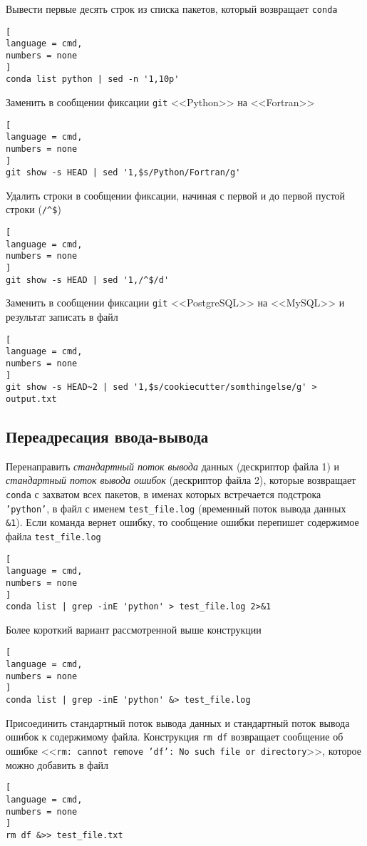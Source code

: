 \documentclass[%
	11pt,
	a4paper,
	utf8,
		]{article}
\begin{document}
Вывести первые десять строк из списка пакетов, который возвращает \texttt{conda}
\begin{lstlisting}[
language = cmd,
numbers = none
]
conda list python | sed -n '1,10p'
\end{lstlisting}

Заменить в сообщении фиксации \texttt{git} <<Python>> на <<Fortran>>
\begin{lstlisting}[
language = cmd,
numbers = none
]
git show -s HEAD | sed '1,$s/Python/Fortran/g'
\end{lstlisting}

Удалить строки в сообщении фиксации, начиная с первой и до первой пустой строки (\verb|/^$|)
\begin{lstlisting}[
language = cmd,
numbers = none
]
git show -s HEAD | sed '1,/^$/d'
\end{lstlisting}

Заменить в сообщении фиксации \texttt{git} <<PostgreSQL>> на <<MySQL>> и результат записать в файл
\begin{lstlisting}[
language = cmd,
numbers = none
]
git show -s HEAD~2 | sed '1,$s/cookiecutter/somthingelse/g' > output.txt
\end{lstlisting}




\subsection{Переадресация ввода-вывода}

Перенаправить \emph{стандартный поток вывода} данных (дескриптор файла 1) и \emph{стандартный поток вывода ошибок} (дескриптор файла 2), которые возвращает \texttt{conda} с захватом всех пакетов, в именах которых встречается подстрока \texttt{'python'}, в файл с именем \texttt{test\_file.log} (временный поток вывода данных \texttt{\&1}). Если команда вернет ошибку, то сообщение ошибки перепишет содержимое файла \texttt{test\_file.log}
\begin{lstlisting}[
language = cmd,
numbers = none
]
conda list | grep -inE 'python' > test_file.log 2>&1
\end{lstlisting}

Более короткий вариант рассмотренной выше конструкции
\begin{lstlisting}[
language = cmd,
numbers = none
]
conda list | grep -inE 'python' &> test_file.log
\end{lstlisting}

Присоединить стандартный поток вывода данных и стандартный поток вывода ошибок к содержимому файла. Конструкция \texttt{rm df} возвращает сообщение об ошибке <<\texttt{rm: cannot remove 'df': No such file or directory}>>, которое можно добавить в файл
\begin{lstlisting}[
language = cmd,
numbers = none
]
rm df &>> test_file.txt
\end{lstlisting}
\end{document}
